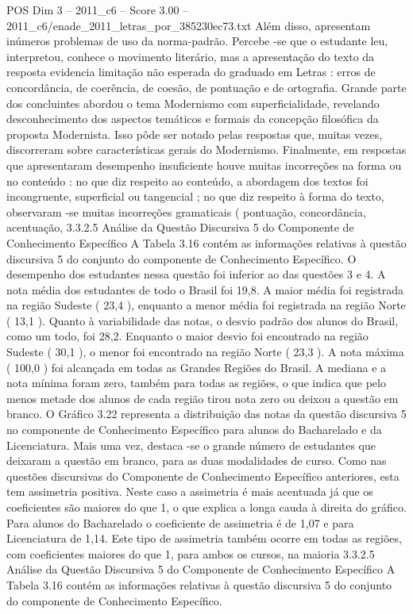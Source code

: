 \begin{textsample}{POS Dim 3 – 2011\_c6 – Score 3.00 – 2011\_c6/enade\_2011\_letras\_por\_385230ec73.txt}
Além disso, apresentam inúmeros problemas de uso da norma-padrão.
Percebe -se que o estudante leu, interpretou, conhece o movimento literário, mas a apresentação do texto da resposta evidencia limitação não esperada do graduado em Letras : erros de concordância, de coerência, de coesão, de pontuação e de ortografia.
Grande parte dos concluintes abordou o tema Modernismo com superficialidade, revelando desconhecimento dos aspectos temáticos e formais da concepção filosófica da proposta Modernista.
Isso pôde ser notado pelas respostas que, muitas vezes, discorreram sobre características gerais do Modernismo.
Finalmente, em respostas que apresentaram desempenho insuficiente houve muitas incorreções na forma ou no conteúdo : no que diz respeito ao conteúdo, a abordagem dos textos foi incongruente, superficial ou tangencial ; no que diz respeito à forma do texto, observaram -se muitas incorreções gramaticais ( pontuação, concordância, acentuação, 3.3.2.5 Análise da Questão Discursiva 5 do Componente de Conhecimento Específico A Tabela 3.16 contém as informações relativas à questão discursiva 5 do conjunto do componente de Conhecimento Específico.
O desempenho dos estudantes nessa questão foi inferior ao das questões 3 e 4.
A nota média dos estudantes de todo o Brasil foi 19,8.
A maior média foi registrada na região Sudeste ( 23,4 ), enquanto a menor média foi registrada na região Norte ( 13,1 ).
Quanto à variabilidade das notas, o desvio padrão dos alunos do Brasil, como um todo, foi 28,2.
Enquanto o maior desvio foi encontrado na região Sudeste ( 30,1 ), o menor foi encontrado na região Norte ( 23,3 ).
A nota máxima ( 100,0 ) foi alcançada em todas as Grandes Regiões do Brasil.
A mediana e a nota mínima foram zero, também para todas as regiões, o que indica que pelo menos metade dos alunos de cada região tirou nota zero ou deixou a questão em branco.
O Gráfico 3.22 representa a distribuição das notas da questão discursiva 5 no componente de Conhecimento Específico para alunos do Bacharelado e da Licenciatura.
Mais uma vez, destaca -se o grande número de estudantes que deixaram a questão em branco, para as duas modalidades de curso.
Como nas questões discursivas do Componente de Conhecimento Específico anteriores, esta tem assimetria positiva.
Neste caso a assimetria é mais acentuada já que os coeficientes são maiores do que 1, o que explica a longa cauda à direita do gráfico.
Para alunos do Bacharelado o coeficiente de assimetria é de 1,07 e para Licenciatura de 1,14.
Este tipo de assimetria também ocorre em todas as regiões, com coeficientes maiores do que 1, para ambos os cursos, na maioria 3.3.2.5 Análise da Questão Discursiva 5 do Componente de Conhecimento Específico A Tabela 3.16 contém as informações relativas à questão discursiva 5 do conjunto do componente de Conhecimento Específico.

\end{textsample}
